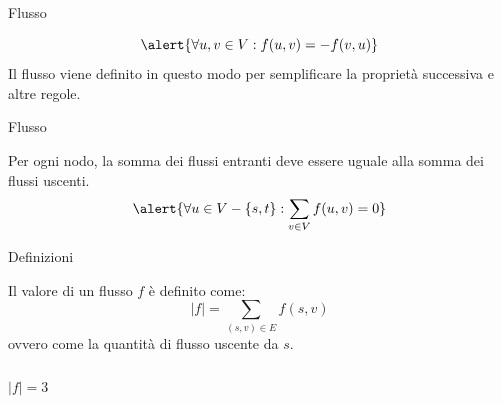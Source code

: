 \begin{frame}{Flusso}

\vspace{-9pt}
\begin{myboxtitle}[Antisimmetria]
\[
\alert{\forall u,v \in V: f(u,v) = -f(v,u)}
\]
Il flusso viene definito in questo modo per semplificare la proprietà successiva e altre regole.
\end{myboxtitle}

\smallskip
\begin{center}
\end{center}

\end{frame}

\begin{frame}{Flusso}

\vspace{-9pt}
\begin{myboxtitle}
Per ogni nodo, la somma dei flussi entranti deve essere uguale alla somma dei flussi uscenti.
\[
\alert{\forall u \in V-\{s,t\}: \sum_{v \in V} f(u,v) = 0}
\]
\end{myboxtitle}

\smallskip
\begin{center}
\end{center}

\end{frame}

\begin{frame}{Definizioni}

\vspace{-9pt}
\begin{myboxtitle}
Il \alert{valore di un flusso} $f$ è definito come:
\[
  |f| = \sum_{(s, v) \in E} f(s,v)
\]
ovvero come la quantità di flusso uscente da $s$.
\end{myboxtitle}

\begin{columns}[T]
\[|f| = 3\]
\vspace{-12pt}
\end{columns}

\end{frame}

